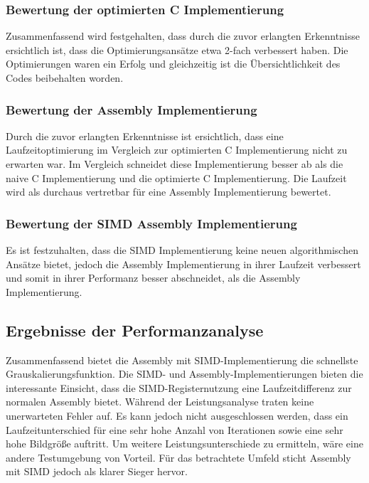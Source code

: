 \documentclass[course=asp]{aspdoc}
\begin{document}
\subsubsection{Bewertung der optimierten C Implementierung}
Zusammenfassend wird festgehalten, dass durch die zuvor erlangten Erkenntnisse ersichtlich ist, dass die Optimierungsansätze etwa 2-fach verbessert haben. Die Optimierungen waren ein Erfolg und gleichzeitig ist die Übersichtlichkeit des Codes beibehalten worden. 

\subsubsection{Bewertung der Assembly Implementierung}
Durch die zuvor erlangten Erkenntnisse ist ersichtlich, dass eine Laufzeitoptimierung im Vergleich zur optimierten C Implementierung nicht zu erwarten war. Im Vergleich schneidet diese Implementierung besser ab als die naive C Implementierung und die optimierte C Implementierung. Die Laufzeit wird als durchaus vertretbar für eine Assembly Implementierung bewertet.

\subsubsection{Bewertung der SIMD Assembly Implementierung}
Es ist festzuhalten, dass die SIMD Implementierung keine neuen algorithmischen Ansätze bietet, jedoch die Assembly Implementierung in ihrer Laufzeit verbessert und somit in ihrer Performanz besser abschneidet, als die Assembly Implementierung.


\subsection{Ergebnisse der Performanzanalyse}
Zusammenfassend bietet die Assembly mit SIMD-Implementierung die schnellste Grauskalierungsfunktion. Die SIMD- und Assembly-Implementierungen bieten die interessante Einsicht, dass die SIMD-Registernutzung eine Laufzeitdifferenz zur normalen Assembly bietet. Während der Leistungsanalyse traten keine unerwarteten Fehler auf. Es kann jedoch nicht ausgeschlossen werden, dass ein Laufzeitunterschied für eine sehr hohe Anzahl von Iterationen sowie eine sehr hohe Bildgröße auftritt. Um weitere Leistungsunterschiede zu ermitteln, wäre eine andere Testumgebung von Vorteil. Für das betrachtete Umfeld sticht Assembly mit SIMD jedoch als klarer Sieger hervor.
\end{document}

